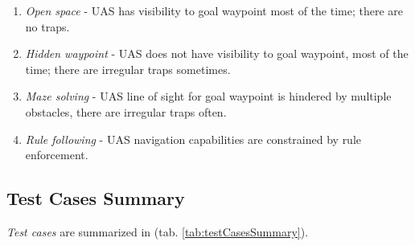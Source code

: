 \begin{enumerate}
    \item \emph{Open space} - UAS has visibility to goal waypoint most of the time; there are no traps.
    
    \item \emph{Hidden waypoint} - UAS does not have visibility to goal waypoint, most of the time; there are irregular traps sometimes.
    
    \item \emph{Maze solving} - UAS line of sight for goal waypoint is hindered by multiple obstacles, there are irregular traps often.
    
    \item \emph{Rule following} - UAS navigation capabilities are constrained by rule enforcement.
\end{enumerate}

\newpage
\subsection{Test Cases Summary}\label{s:testCaseSummary}

\noindent \emph{Test cases} are summarized in (tab. \ref{tab:testCasesSummary}).

